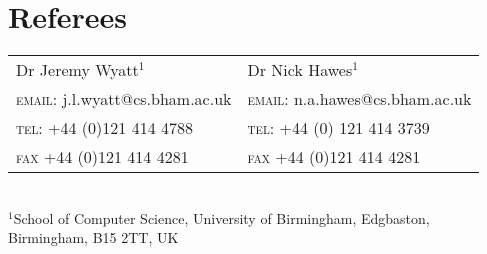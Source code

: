 \documentclass[a4paper,10pt]{article}
\begin{document}
\section{Referees}

\begin{center}
  \begin{tabular}{l|l}
  Dr Jeremy Wyatt$^1$ & Dr Nick Hawes$^1$\\ %
  \textsc{email}: j.l.wyatt@cs.bham.ac.uk&\textsc{email}: n.a.hawes@cs.bham.ac.uk\\
  \textsc{tel}: +44 (0)121 414 4788&\textsc{tel}: +44 (0) 121 414 3739\\
  \textsc{fax} +44 (0)121 414 4281&\textsc{fax} +44 (0)121 414 4281\\
\end{tabular}\\\vspace{0.2cm}
\footnotesize{$^1$School of Computer Science, University of Birmingham, Edgbaston, Birmingham, B15 2TT, UK}\\
\end{center}
\end{document}
